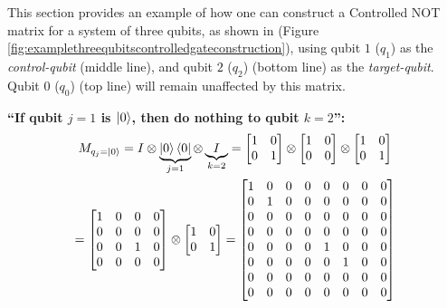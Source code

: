 \documentclass[conference]{IEEEtran}
\begin{document}
\begin{appendices}
This section provides an example of how one can construct a Controlled NOT matrix
for a system of three qubits, as shown in (Figure \ref{fig:examplethreequbitscontrolledgateconstruction}),
using qubit $1$ ($q_1$) as the \textit{control-qubit} (middle line), and qubit $2$ ($q_2$) (bottom line) as the
\textit{target-qubit}. Qubit $0$ ($q_0$) (top line) will remain unaffected by this matrix.
\newline

\textbf{``If qubit $j=1$ is $\ket{0}$, then do nothing to qubit $k=2$'':}
\begin{multline*}
    M_{q_{j}=\ket{0}}
    = I \otimes \underbrace{\ket{0} \bra{0}}_{j=1} \otimes \underbrace{I}_{k=2}
    =
    \begin{bmatrix}
        1 & 0 \\
        0 & 1
    \end{bmatrix}
    \otimes
    \begin{bmatrix}
        1 & 0 \\
        0 & 0
    \end{bmatrix}
    \otimes
    \begin{bmatrix}
        1 & 0 \\
        0 & 1
    \end{bmatrix} \\
    =
    \begin{bmatrix}
        1 & 0 & 0 & 0 \\
        0 & 0 & 0 & 0 \\
        0 & 0 & 1 & 0 \\
        0 & 0 & 0 & 0
    \end{bmatrix}
    \otimes
    \begin{bmatrix}
        1 & 0 \\
        0 & 1
    \end{bmatrix}
    =
    \begin{bmatrix}
        1 & 0 & 0 & 0 & 0 & 0 & 0 & 0 \\
        0 & 1 & 0 & 0 & 0 & 0 & 0 & 0 \\
        0 & 0 & 0 & 0 & 0 & 0 & 0 & 0 \\
        0 & 0 & 0 & 0 & 0 & 0 & 0 & 0 \\
        0 & 0 & 0 & 0 & 1 & 0 & 0 & 0 \\
        0 & 0 & 0 & 0 & 0 & 1 & 0 & 0 \\
        0 & 0 & 0 & 0 & 0 & 0 & 0 & 0 \\
        0 & 0 & 0 & 0 & 0 & 0 & 0 & 0 \\
    \end{bmatrix}
\end{multline*}


\end{appendices}
\end{document}
